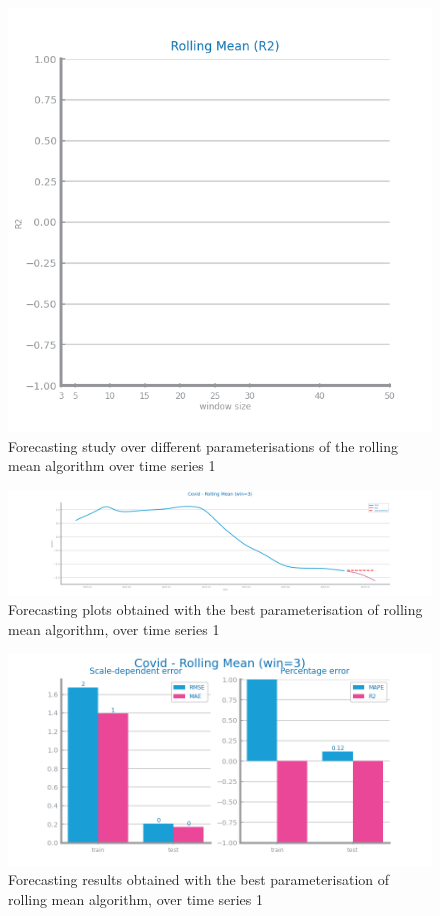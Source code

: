 \documentclass[10pt]{extarticle}
\begin{document}
\begin{figure}[H]
\centering\includegraphics[scale=0.5]{images/dataset1/time_series/Covid_rollingmean_R2_study.png}
\caption{Forecasting study over different parameterisations of the rolling mean algorithm over time series 1}
\end{figure}

\begin{figure}[H]
\centering\includegraphics[scale=0.4]{images/dataset1/time_series/Covid - Rolling Mean (win=3)_forecasting_series.png}
\caption{Forecasting plots obtained with the best parameterisation of rolling mean algorithm, over time series 1}
\end{figure}

\begin{figure}[H]
\centering\includegraphics[scale=0.5]{images/dataset1/time_series/Covid - Rolling Mean (win=3)_forecasting_eval.png}
\caption{Forecasting results obtained with the best parameterisation of rolling mean algorithm, over time series 1}
\end{figure}
\end{document}
